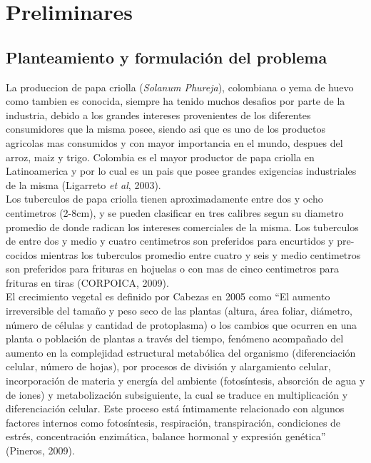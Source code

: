 \chapter{Preliminares}

\section{Planteamiento y formulaci\'on del problema}

La produccion de papa criolla (\textit{Solanum Phureja}), colombiana o yema de huevo como tambien es conocida, siempre ha tenido muchos desafios por parte de la industria, debido a los grandes intereses provenientes de los diferentes consumidores que la misma posee, siendo asi que es uno de los productos agricolas mas consumidos y con mayor importancia en el mundo, despues del arroz, maiz y trigo. Colombia es el mayor productor de papa criolla en Latinoamerica y por lo cual es un pais que posee grandes exigencias industriales de la misma (Ligarreto \textit{et al}, 2003).\\

Los tuberculos de papa criolla tienen aproximadamente entre dos y ocho centimetros (2-8cm), y se pueden clasificar en tres calibres segun su diametro promedio de donde radican los intereses comerciales de la misma. Los tuberculos de entre dos y medio y cuatro centimetros son preferidos para encurtidos y pre-cocidos mientras los tuberculos promedio entre cuatro y seis y medio centimetros son preferidos para frituras en hojuelas o con mas de cinco centimetros para frituras en tiras (CORPOICA, 2009).\\

El crecimiento vegetal es definido por Cabezas en 2005 como "`El aumento irreversible del tamaño y peso seco de las plantas (altura, área foliar, diámetro, número de células y cantidad de protoplasma) o los cambios que ocurren en una planta o población de plantas a través del tiempo, fenómeno acompañado del aumento en la complejidad estructural metabólica del organismo (diferenciación celular, número de hojas), por procesos de división y alargamiento celular, incorporación de materia y energía del ambiente (fotosíntesis, absorción de agua y de iones) y metabolización subsiguiente, la cual se traduce en multiplicación y diferenciación celular. Este proceso está íntimamente relacionado con algunos factores internos como fotosíntesis, respiración, transpiración, condiciones de estrés, concentración enzimática, balance hormonal y expresión genética"' (Pineros, 2009).\\

